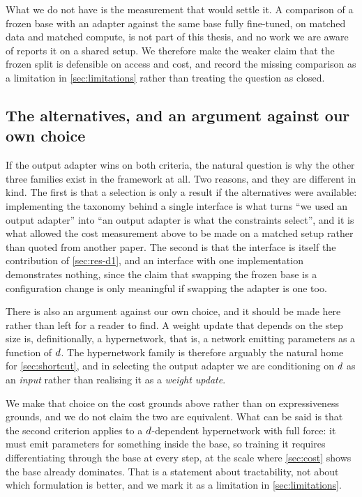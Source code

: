 What we do not have is the measurement that would settle it. A comparison
of a frozen base with an adapter against the same base fully fine-tuned, on
matched data and matched compute, is not part of this thesis, and no work
we are aware of reports it on a shared setup. We therefore make the weaker
claim that the frozen split is defensible on access and cost, and record
the missing comparison as a limitation in \cref{sec:limitations} rather
than treating the question as closed.

\subsection{The alternatives, and an argument against our own choice}

If the output adapter wins on both criteria, the natural question is why
the other three families exist in the framework at all. Two reasons, and
they are different in kind. The first is that a selection is only a result
if the alternatives were available: implementing the taxonomy behind a
single interface is what turns ``we used an output adapter'' into ``an
output adapter is what the constraints select'', and it is what allowed the
cost measurement above to be made on a matched setup rather than quoted
from another paper. The second is that the interface is itself the
contribution of \cref{sec:res-d1}, and an interface with one implementation
demonstrates nothing, since the claim that swapping the frozen base is a
configuration change is only meaningful if swapping the adapter is one too.

There is also an argument against our own choice, and it should be made
here rather than left for a reader to find. A weight update that depends on
the step size is, definitionally, a hypernetwork, that is, a network
emitting parameters as a function of $d$. The hypernetwork family is
therefore arguably the natural home for \cref{sec:shortcut}, and in
selecting the output adapter we are conditioning on $d$ as an
\emph{input} rather than realising it as a \emph{weight update}.

We make that choice on the cost grounds above rather than on expressiveness
grounds, and we do not claim the two are equivalent. What can be said is
that the second criterion applies to a $d$-dependent hypernetwork with
full force: it must emit parameters for something inside the base, so
training it requires differentiating through the base at every step, at the
scale where \cref{sec:cost} shows the base already dominates. That is a
statement about tractability, not about which formulation is better, and we
mark it as a limitation in \cref{sec:limitations}.

